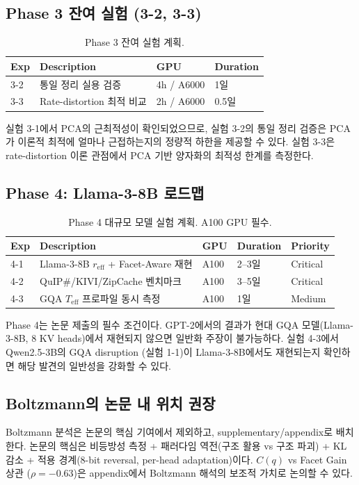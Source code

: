 \documentclass[11pt,a4paper]{article}
\begin{document}
\subsection{Phase 3 잔여 실험 (3-2, 3-3)}

\begin{table}[H]
\centering
\caption{Phase 3 잔여 실험 계획.}
\begin{tabular}{llll}
\toprule
\textbf{Exp} & \textbf{Description} & \textbf{GPU} & \textbf{Duration} \\
\midrule
3-2 & 통일 정리 실용 검증 & 4h / A6000 & 1일 \\
3-3 & Rate-distortion 최적 비교 & 2h / A6000 & 0.5일 \\
\bottomrule
\end{tabular}
\end{table}

실험 3-1에서 PCA의 근최적성이 확인되었으므로, 실험 3-2의 통일 정리 검증은 PCA가 이론적 최적에 얼마나 근접하는지의 정량적 하한을 제공할 수 있다.
실험 3-3은 rate-distortion 이론 관점에서 PCA 기반 양자화의 최적성 한계를 측정한다.

\subsection{Phase 4: Llama-3-8B 로드맵}

\begin{table}[H]
\centering
\caption{Phase 4 대규모 모델 실험 계획. A100 GPU 필수.}
\begin{tabular}{lllll}
\toprule
\textbf{Exp} & \textbf{Description} & \textbf{GPU} & \textbf{Duration} & \textbf{Priority} \\
\midrule
4-1 & Llama-3-8B $r_\mathrm{eff}$ + Facet-Aware 재현 & A100 & 2--3일 & Critical \\
4-2 & QuIP\#/KIVI/ZipCache 벤치마크 & A100 & 3--5일 & Critical \\
4-3 & GQA $T_\mathrm{eff}$ 프로파일 동시 측정 & A100 & 1일 & Medium \\
\bottomrule
\end{tabular}
\end{table}

Phase 4는 논문 제출의 필수 조건이다.
GPT-2에서의 결과가 현대 GQA 모델(Llama-3-8B, 8 KV heads)에서 재현되지 않으면 일반화 주장이 불가능하다.
실험 4-3에서 Qwen2.5-3B의 GQA disruption (실험 1-1)이 Llama-3-8B에서도 재현되는지 확인하면 해당 발견의 일반성을 강화할 수 있다.

\subsection{Boltzmann의 논문 내 위치 권장}

Boltzmann 분석은 논문의 핵심 기여에서 제외하고, supplementary/appendix로 배치한다.
논문의 핵심은 비등방성 측정 + 패러다임 역전(구조 활용 vs 구조 파괴) + KL 감소 + 적용 경계(8-bit reversal, per-head adaptation)이다.
$C(q)$ vs Facet Gain 상관 ($\rho = -0.63$)은 appendix에서 Boltzmann 해석의 보조적 가치로 논의할 수 있다.
\end{document}
